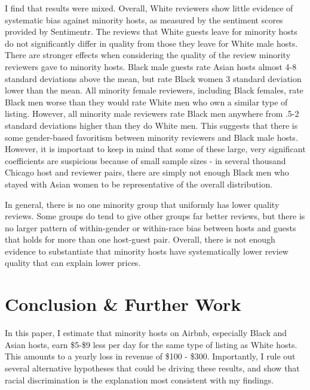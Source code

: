 \documentclass[11pt, oneside]{article}
\begin{document}
I find that results were mixed. Overall, White reviewers show little evidence of systematic bias against minority hosts, as measured by the sentiment scores provided by Sentimentr. The reviews that White guests leave for minority hosts do not significantly differ in quality from those they leave for White male hosts. There are stronger effects when considering the quality of the review minority reviewers gave to minority hosts. Black male guests rate Asian hosts almost 4-8 standard deviations above the mean, but rate Black women 3 standard deviation lower than the mean. All minority female reviewers, including Black females, rate Black men worse than they would rate White men who own a similar type of listing. However, all minority male reviewers rate Black men anywhere from .5-2 standard deviations higher than they do White men. This suggests that there is some gender-based favoritism between minority reviewers and Black male hosts. However, it is important to keep in mind that some of these large, very significant coefficients are suspicious because of small sample sizes - in several thousand Chicago host and reviewer pairs, there are simply not enough Black men who stayed with Asian women to be representative of the overall distribution.

In general, there is no one minority group that uniformly has lower quality reviews. Some groups do tend to give other groups far better reviews, but there is no larger pattern of within-gender or within-race bias between hosts and guests that holds for more than one host-guest pair. Overall, there is not enough evidence to substantiate that minority hosts have systematically lower review quality that can explain lower prices. 



\section{Conclusion \& Further Work}

In this paper, I estimate that minority hosts on Airbnb, especially Black and Asian hosts, earn \$5-\$9 less per day for the same type of listing as White hosts. This amounts to a yearly loss in revenue of \$100 - \$300. Importantly, I rule out several alternative hypotheses that could be driving these results, and show that racial discrimination is the explanation most consistent with my findings. 
\end{document}
